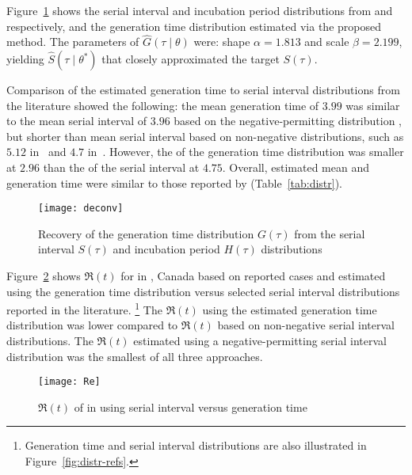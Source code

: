 Figure~\ref{fig:deconv} shows the
serial interval and incubation period distributions
from \cite{Du2020} and \cite{Lauer2020} respectively,
and the generation time distribution estimated via the proposed method.  %
The \mle parameters of $\hat{G}(\tau\mid\theta)$ were:
shape ${\alpha = 1.813}$ and scale ${\beta = 2.199}$,
yielding $\hat{S}(\tau\mid\theta^*)$ that closely approximated
the target $S(\tau)$.
\par
Comparison of the estimated generation time to serial interval distributions from the literature 
showed the following: the mean generation time of $3.99$ was similar to
the mean serial interval of $3.96$
based on the negative-permitting distribution \cite{Du2020},
but shorter than mean serial interval based on non-negative distributions,
such as $5.12$ in~\cite{Zhang2020} and $4.7$ in~\cite{Nishiura2020}.  %
However, the \sd of the generation time distribution was smaller at $2.96$
than the \sd of the serial interval at $4.75$.   %
Overall, estimated mean and \sd generation time
were similar to those reported by \textcite{Ganyani2020}  %
(Table~\ref{tab:distr}).
\par
\begin{figure}
  \centering
  \texttt{[image: deconv]}
  \caption{Recovery of the generation time distribution $G(\tau)$
    from the serial interval $S(\tau)$
    and incubation period $H(\tau)$ distributions}
  \label{fig:deconv}
\end{figure}
\par
Figure~\ref{fig:Re(t)} shows
$\Re(t)$ for \covid in \gta, Canada
based on reported cases and estimated using
the generation time distribution versus
selected serial interval distributions reported in the literature.%
\footnote{Generation time and serial interval distributions
  are also illustrated in Figure~\ref{fig:distr-refs}.}
The $\Re(t)$ using the estimated generation time distribution
was lower compared to $\Re(t)$ based on non-negative serial interval distributions.  %
The $\Re(t)$ estimated using
a negative-permitting serial interval distribution was the smallest of all three approaches. %
\par
\begin{figure}[h]
  \centering
  \texttt{[image: Re]}
  \caption{$\Re(t)$ of \covid in \gta using
    serial interval versus generation time}
  \label{fig:Re(t)}
\end{figure}